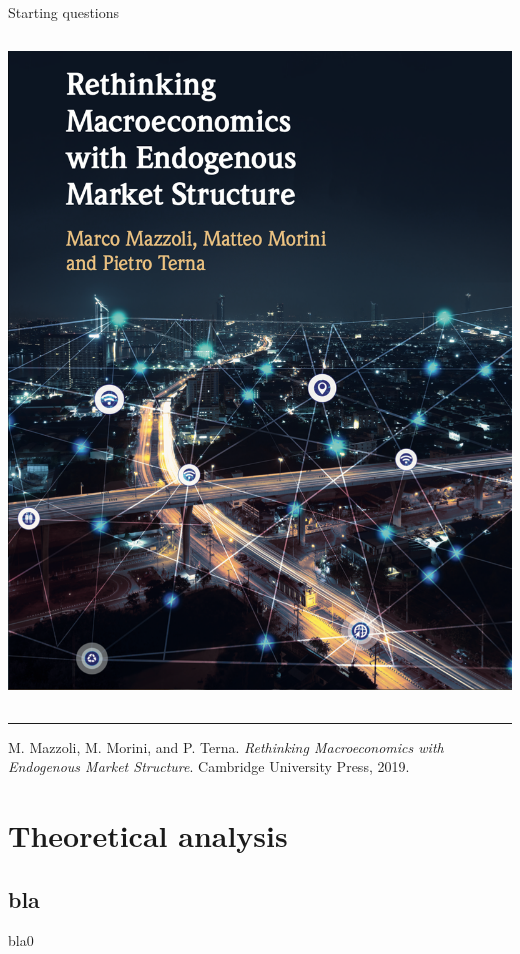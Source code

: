 \documentclass[9pt]{beamer}
\begin{document}
\begin{frame}{Starting questions}
\begin{columns}[T]
 \begin{column}{.4\textwidth}
 \begin{block}{}
 \includegraphics[scale=0.25]{cover.png}
  \end{block}
  \end{column}
    
\end{columns}


\smallskip

\noindent\rule{8cm}{0.4pt}
\scriptsize

M. Mazzoli, M. Morini, and P. Terna. \emph{Rethinking Macroeconomics with Endogenous Market Structure}. Cambridge University Press, 2019.

\end{frame}


\section{Theoretical analysis}

\subsection{bla}
\begin{frame}{bla0}

\end{frame}
\end{document}
